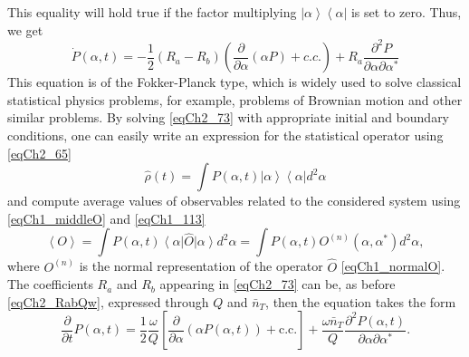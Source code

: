 This equality will hold true if the factor multiplying  
$\left|\alpha\right>\left<\alpha\right|$ is set to zero. Thus, we get 
\begin{equation}
\dot{P}\left(\alpha, t\right) = 
-\frac{1}{2}\left(R_a - R_b\right)
\left(
\frac{\partial}{\partial \alpha}\left(\alpha P\right) + c.c.
\right)
+ R_a
\frac{\partial^2 P}{\partial \alpha \partial \alpha^{*}}
\label{eqCh2_73}
\end{equation}
This equation is of the Fokker-Planck type, which is widely used to
solve classical statistical physics problems, for example, problems of
Brownian motion and other similar problems. By solving
\eqref{eqCh2_73} with appropriate initial and boundary conditions,
one can easily write an expression for the
statistical operator using \eqref{eqCh2_65} 
\[
\hat{\rho}\left(t\right) = 
\int P\left(\alpha, t\right)
\left|\alpha\right>\left<\alpha\right| 
d^2 \alpha
\]
and compute average values of observables related to the considered
system using \eqref{eqCh1_middleO} and \eqref{eqCh1_113}   
\[
\left<O\right>= \int P\left(\alpha, t\right) \left<\alpha\right|\hat{O}\left|\alpha\right>d^2
\alpha =
\int  P\left(\alpha, t\right)O^{\left(n\right)}\left(\alpha, \alpha^{*}\right)d^2\alpha,
\]
where $O^{\left(n\right)}$ is the normal representation of the operator $\hat{O}$ \eqref{eqCh1_normalO}.
The coefficients  $R_a$ and  $R_b$ appearing in \eqref{eqCh2_73} can be,
as before \eqref{eqCh2_RabQw}, expressed through  $Q$  and $\bar{n}_T$,
then the equation takes the form 
\begin{equation}
\frac{\partial}{\partial t}P\left(\alpha, t\right) = 
\frac{1}{2}\frac{\omega}{Q}\left[
\frac{\partial}{\partial \alpha}\left(
\alpha P\left(\alpha, t\right)
\right) + \mbox{c.c.}
\right]
+
\frac{\omega \bar{n}_T}{Q} \frac{\partial^2  P\left(\alpha,
  t\right)}{\partial \alpha \partial \alpha^{*}}.
\label{eqCh2_74}
\end{equation}

